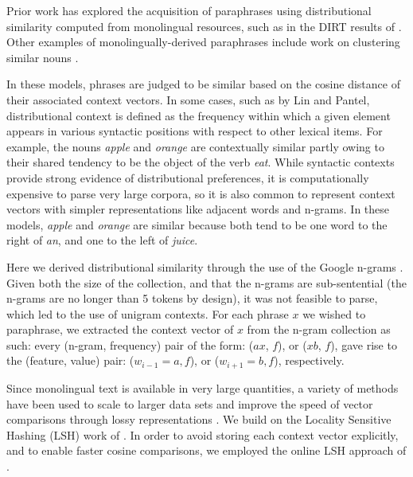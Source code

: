 \documentclass[11pt]{article}
\begin{document}
Prior work has explored the acquisition of paraphrases using distributional similarity computed from monolingual resources, such as in the DIRT results of .
Other examples of monolingually-derived paraphrases include work on clustering similar nouns \cite{ravichandranACL05}.

In these models, phrases are judged to be similar based on the cosine distance of their associated context vectors. In some cases, such as by Lin and Pantel, distributional context is defined as the frequency within which a given element appears in various syntactic positions with respect to other lexical items. For example, the nouns \emph{apple} and \emph{orange} are contextually similar partly owing to their shared tendency to be the object of the verb \emph{eat}. While syntactic contexts provide strong evidence of distributional preferences, it is computationally expensive to parse very large corpora, so it is also common to represent context vectors with simpler representations like adjacent words and n-grams.
 In these models, \emph{apple} and \emph{orange} are similar because both tend to be one word to the right of \emph{an}, and one to the left of \emph{juice}.


Here we derived distributional similarity through the use of the Google n-grams \cite{GoogleNgrams}. Given both the size of the collection, and that the n-grams are sub-sentential (the n-grams are no longer than 5 tokens by design), it was not feasible to parse, which led to the use of unigram contexts. For each phrase $x$ we wished to paraphrase, we extracted the context vector of $x$ from the n-gram collection as such: every (n-gram, frequency) pair of the form: ($a x$, $f$), or ($x b$, $f$), gave rise to the (feature, value) pair: ($w_{i-1}=a, f$), or ($w_{i+1}=b, f$), respectively. 


Since monolingual text is available in very large quantities, a variety of methods have been used to scale to larger data sets \cite{IndykSTOC98}  and improve the speed of vector comparisons through lossy representations \cite{Charikar02}.  We build on the Locality Sensitive Hashing (LSH) work of  . In order to avoid storing each context vector explicitly, and to enable faster cosine comparisons, we employed the online LSH approach of .


\end{document}
